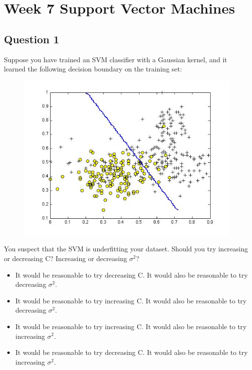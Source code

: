 \documentclass[11pt]{article} %
\begin{document}
	

\section{Week 7 Support Vector Machines}


\subsection*{Question 1}
Suppose you have trained an SVM classifier with a Gaussian kernel, and it learned the following decision boundary on the training set:
\begin{figure}
\centering
\includegraphics[width=0.7\linewidth]{images/SVM1}
\caption{}
\label{fig:SVM1}
\end{figure}


You suspect that the SVM is underfitting your dataset. Should you try increasing or decreasing C? Increasing or decreasing $\sigma^2$?

\begin{itemize}
	\item It would be reasonable to try decreasing C. It would also be reasonable to try decreasing $\sigma^2$.
	
	\item It would be reasonable to try increasing C. It would also be reasonable to try decreasing $\sigma^2$.
	
	\item It would be reasonable to try increasing C. It would also be reasonable to try increasing $\sigma^2$.
	
	\item It would be reasonable to try decreasing C. It would also be reasonable to try increasing $\sigma^2$.
\end{itemize}
\end{document}
